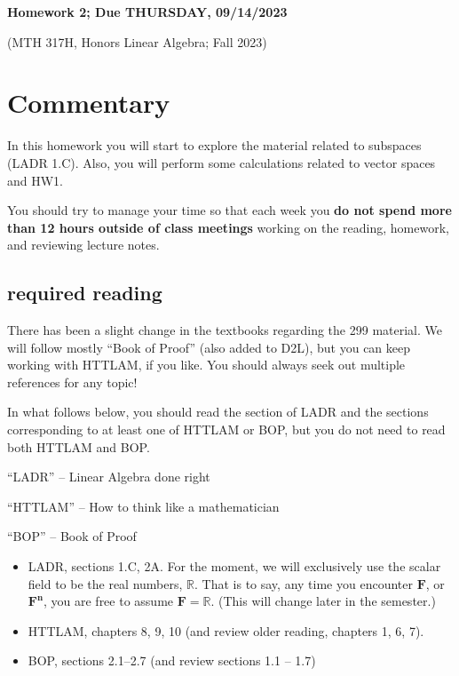 \documentclass[12pt]{article}
\def\real{{\mathbb R}}
\begin{document}
	\begin{LARGE}
	\begin{center}
		
	
		
		
	\textbf{Homework 2; Due THURSDAY, 09/14/2023}
	

	(MTH 317H, Honors Linear Algebra;  Fall 2023)
	\end{center}
	\end{LARGE}
	\vspace{0.15in}
	
	
	
	
\section{Commentary}

In this homework you will start to explore the material related to subspaces (LADR 1.C).  Also, you will perform some calculations related to vector spaces and HW1.  

You should try to manage your time so that each week you \textbf{do not spend more than 12 hours outside of class meetings} working on the reading, homework, and reviewing lecture notes.




\subsection{required reading}

There has been a slight change in the textbooks regarding the 299 material.  We will follow mostly ``Book of Proof'' (also added to D2L), but you can keep working with HTTLAM, if you like.  You should always seek out multiple references for any topic!\


In what follows below, you should read the section of LADR and the sections corresponding to at least one of HTTLAM or BOP, but you do not need to read both HTTLAM and BOP.



\noindent
``LADR'' -- Linear Algebra done right

\noindent
``HTTLAM'' -- How to think like a mathematician

\noindent
``BOP'' -- Book of Proof

\begin{itemize}
	\item LADR, sections 1.C, 2A.  For the moment, we will exclusively use the scalar field to be the real numbers, $\real$.  That is to say, any time you encounter $\mathbf{F}$, or $\mathbf{F^n}$, you are free to assume $\mathbf{F}=\real$.  (This will change later in the semester.)
	
	\item HTTLAM, chapters 8, 9, 10  (and review older reading, chapters 1, 6, 7).
	
	\item BOP, sections 2.1--2.7 (and review sections 1.1 -- 1.7)
\end{itemize}
\end{document}
